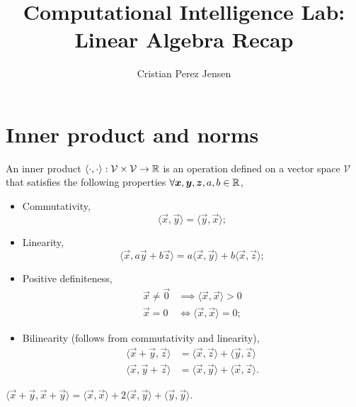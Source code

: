 \documentclass[justified,nobib]{tufte-handout}
\title{Computational Intelligence Lab: Linear Algebra Recap}
\author{Cristian Perez Jensen}
\newcommand{\ang}[1]{\langle #1 \rangle}
\begin{document}
\maketitle
\newpage
{}
\tableofcontents
{}
\newpage\cleardoublepage{}

\section{Inner product and norms}

\begin{definition}
    An inner product $\ang{\cdot,\cdot}: \mathcal{V} \times \mathcal{V} \to \R$ is an operation
    defined on a vector space $\mathcal{V}$ that satisfies the following properties $\forall \bm{x},\bm{y},\bm{z},a,b\in \mathbb{R}$,
    \begin{itemize}
        \item Commutativity, \[
                  \ang{\vec{x},\vec{y}} = \ang{\vec{y},\vec{x}};
              \]
        \item Linearity, \[
                  \ang{\vec{x},a \vec{y} + b \vec{z}} = a \ang{\vec{x},\vec{y}} + b\ang{\vec{x},\vec{z}};
              \]
        \item Positive definiteness,
              \begin{align*}
                  \vec{x} \neq \vec{0} & \implies \ang{\vec{x},\vec{x}} > 0 \\
                  \vec{x} = 0          & \iff \ang{\vec{x},\vec{x}} = 0;
              \end{align*}
        \item Bilinearity (follows from commutativity and linearity),
              \begin{align*}
                  \ang{\vec{x} + \vec{y}, \vec{z}} & = \ang{\vec{x},\vec{z}} + \ang{\vec{y},\vec{z}}  \\
                  \ang{\vec{x},\vec{y} + \vec{z}}  & = \ang{\vec{x},\vec{y}} + \ang{\vec{x},\vec{z}}.
              \end{align*}
    \end{itemize}
\end{definition}

\begin{corollary}
    $\ang{\vec{x}+\vec{y},\vec{x}+\vec{y}} = \ang{\vec{x},\vec{x}} + 2\ang{\vec{x},\vec{y}} + \ang{\vec{y},\vec{y}}$.
\end{corollary}
\end{document}
